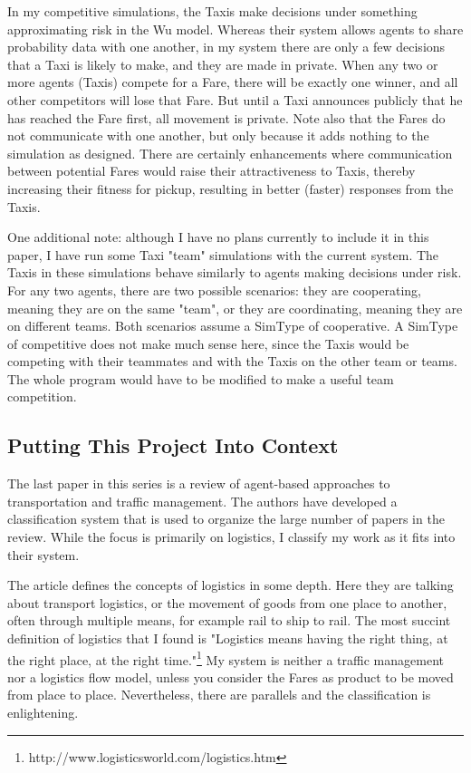 \documentclass[11pt,letterpaper,onecolumn,twoside,openright,draft]{report}
\begin{document}
In my competitive simulations, the Taxis make decisions under something approximating risk in the Wu model.
Whereas their system allows agents to share probability data with one another, in my system there are only a few decisions that a Taxi is likely to make, and they are made in private.
When any two or more agents (Taxis) compete for a Fare, there will be exactly one winner, and all other competitors will lose that Fare.
But until a Taxi announces publicly that he has reached the Fare first, all movement is private.
Note also that the Fares do not communicate with one another, but only because it adds nothing to the simulation as designed.
There are certainly enhancements where communication between potential Fares would raise their attractiveness to Taxis, thereby increasing their fitness for pickup, resulting in better (faster) responses from the Taxis.

One additional note: although I have no plans currently to include it in this paper, I have run some Taxi "team" simulations with the current system.
The Taxis in these simulations behave similarly to agents making decisions under risk.
For any two agents, there are two possible scenarios: they are cooperating, meaning they are on the same "team", or they are coordinating, meaning they are on different teams.
Both scenarios assume a SimType of cooperative.
A SimType of competitive does not make much sense here, since the Taxis would be competing with their teammates and with the Taxis on the other team or teams.
The whole program would have to be modified to make a useful team competition.

\subsection{Putting This Project Into Context}
The last paper in this series is a review of agent-based approaches to transportation and traffic management.
The authors have developed a classification system that is used to organize the large number of papers in the review.
While the focus is primarily on logistics, I classify my work as it fits into their system.

The article defines the concepts of logistics in some depth.
Here they are talking about transport logistics, or the movement of goods from one place to another, often through multiple means, for example rail to ship to rail.
The most succint definition of logistics that I found is "Logistics means having the right thing, at the right place, at the right time."\footnote{http://www.logisticsworld.com/logistics.htm}
My system is neither a traffic management nor a logistics flow model, unless you consider the Fares as product to be moved from place to place.
Nevertheless, there are parallels and the classification is enlightening.
\end{document}
